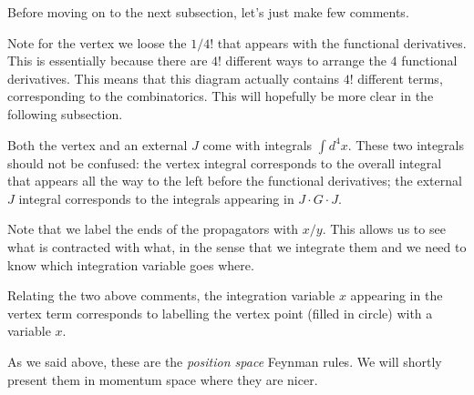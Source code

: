 Before moving on to the next subsection, let's just make few comments.
\ben[label=(\roman*)]
    \item Note for the vertex we loose the $1/4!$ that appears with the functional derivatives. This is essentially because there are $4!$ different ways to arrange the $4$ functional derivatives. This means that this diagram actually contains $4!$ different terms, corresponding to the combinatorics. This will hopefully be more clear in the following subsection.
    \item Both the vertex and an external $J$ come with integrals $\int d^4x$. These two integrals should not be confused: the vertex integral corresponds to the overall integral that appears all the way to the left before the functional derivatives; the external $J$ integral corresponds to the integrals appearing in $J\cdot G \cdot J$.
    \item Note that we label the ends of the propagators with $x/y$. This allows us to see what is contracted with what, in the sense that we integrate them and we need to know which integration variable goes where. 
    \item Relating the two above comments, the integration variable $x$ appearing in the vertex term corresponds to labelling the vertex point (filled in circle) with a variable $x$. 
    \item As we said above, these are the \textit{position space} Feynman rules. We will shortly present them in momentum space where they are nicer. 
\een 


